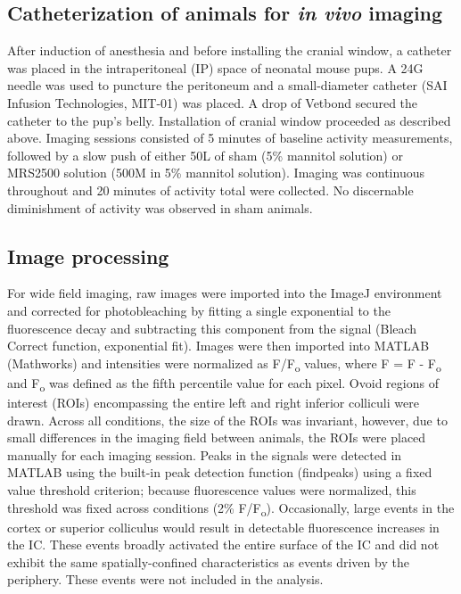 \documentclass[9pt,lineno]{elife}
\begin{document}
\subsection{Catheterization of animals for \textit{in vivo} imaging}
After induction of anesthesia and before installing the cranial window, a catheter was placed in the intraperitoneal (IP) space of neonatal mouse pups. A 24G needle was used to puncture the peritoneum and a small-diameter catheter (SAI Infusion Technologies, MIT-01) was placed. A drop of Vetbond secured the catheter to the pup’s belly. Installation of cranial window proceeded as described above.
Imaging sessions consisted of 5 minutes of baseline activity measurements, followed by a slow push of either 50\textmu L of sham (5\% mannitol solution) or MRS2500 solution (500\textmu M in 5\% mannitol solution). Imaging was continuous throughout and 20 minutes of activity total were collected. No discernable diminishment of activity was observed in sham animals.

\subsection{Image processing}
For wide field imaging, raw images were imported into the ImageJ environment and corrected for photobleaching by fitting a single exponential to the fluorescence decay and subtracting this component from the signal (Bleach Correct function, exponential fit). Images were then imported into MATLAB (Mathworks) and intensities were normalized as \textDelta F/F\textsubscript{o} values, where \textDelta F = F - F\textsubscript{o}  and F\textsubscript{o} was defined as the fifth percentile value for each pixel. Ovoid regions of interest (ROIs) encompassing the entire left and right inferior colliculi were drawn. Across all conditions, the size of the ROIs was invariant, however, due to small differences in the imaging field between animals, the ROIs were placed manually for each imaging session. Peaks in the signals were detected in MATLAB using the built-in peak detection function (findpeaks) using a fixed value threshold criterion; because fluorescence values were normalized, this threshold was fixed across conditions (2\% \textDelta F/F\textsubscript{o}). Occasionally, large events in the cortex or superior colliculus would result in detectable fluorescence increases in the IC. These events broadly activated the entire surface of the IC and did not exhibit the same spatially-confined characteristics as events driven by the periphery. These events were not included in the analysis. 
\end{document}
